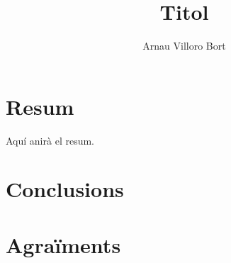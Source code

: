 \documentclass{book}
\title{Titol}
\author{Arnau Villoro Bort}
\begin{document}
\frontmatter

\maketitle

\chapter*{Resum} \label{sec:Resum}
Aquí anirà el resum.

\tableofcontents





\mainmatter







\chapter{Conclusions}
\chapter{Agraïments}


\end{document}
